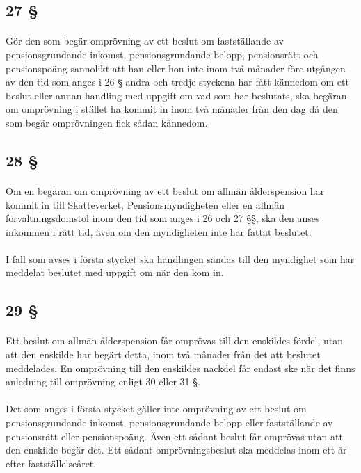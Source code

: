 \documentclass[a4paper,notitlepage,openany,10pt]{book}
\begin{document}
\subsection*{27 §}
\paragraph*{}
Gör den som begär omprövning av ett beslut om fastställande av pensionsgrundande inkomst, pensionsgrundande belopp, pensionsrätt och pensionspoäng sannolikt att han eller hon inte inom två månader före utgången av den tid som anges i 26 § andra och tredje styckena har fått kännedom om ett beslut eller annan handling med uppgift om vad som har beslutats, ska begäran om omprövning i stället ha kommit in inom två månader från den dag då den som begär omprövningen fick sådan kännedom.
\subsection*{28 §}
\paragraph*{}
Om en begäran om omprövning av ett beslut om allmän ålderspension har kommit in till Skatteverket, Pensionsmyndigheten eller en allmän förvaltningsdomstol inom den tid som anges i 26 och 27 §§, ska den anses inkommen i rätt tid, även om den myndigheten inte har fattat beslutet.
\paragraph*{}
I fall som avses i första stycket ska handlingen sändas till den myndighet som har meddelat beslutet med uppgift om när den kom in.
\subsection*{29 §}
\paragraph*{}
Ett beslut om allmän ålderspension får omprövas till den enskildes fördel, utan att den enskilde har begärt detta, inom två månader från det att beslutet meddelades. En omprövning till den enskildes nackdel får endast ske när det finns anledning till omprövning enligt 30 eller 31 §.
\paragraph*{}
Det som anges i första stycket gäller inte omprövning av ett beslut om pensionsgrundande inkomst, pensionsgrundande belopp eller fastställande av pensionsrätt eller pensionspoäng. Även ett sådant beslut får omprövas utan att den enskilde begär det. Ett sådant omprövningsbeslut ska meddelas inom ett år efter fastställelseåret.
\end{document}
